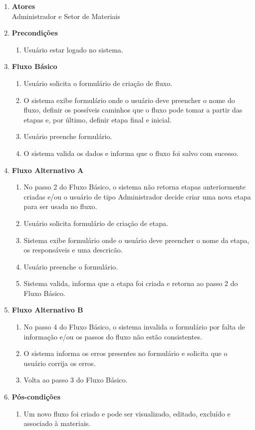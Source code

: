 \begin{enumerate}[label=\textbf{U02}, leftmargin=2cm]
	\begin{enumerate}[label=, leftmargin=0cm]
		\item \textbf{Atores} \\
		Administrador e Setor de Materiais
		\item \textbf{Precondições}
			\begin{enumerate}[label=\arabic*.]
				\item Usuário estar logado no sistema.
			\end{enumerate}
		\item \textbf{Fluxo Básico}
			\begin{enumerate}[label=\arabic*.]
				\item Usuário solicita o formulário de criação de fluxo.
				\item O sistema exibe formulário onde o usuário deve preencher o nome do fluxo, definir os possíveis caminhos que o fluxo pode tomar a partir das etapas e, por último, definir etapa final e inicial.
				\item Usuário preenche formulário.
				\item O sistema valida os dados e informa que o fluxo foi salvo com sucesso.
			\end{enumerate}
		\item \textbf{Fluxo Alternativo A}
			\begin{enumerate}[label=\arabic*.]
				\item No passo 2 do Fluxo Básico, o sistema não retorna etapas anteriormente criadas e/ou o usuário de tipo Administrador decide criar uma nova etapa para ser usada no fluxo. 
				\item Usuário solicita formulário de criação de etapa.
				\item Sistema exibe formulário onde o usuário deve preencher o nome da etapa, os responsáveis e uma descricão.
				\item Usuário preenche o formulário.
				\item Sistema valida, informa que a etapa foi criada e retorna ao passo 2 do Fluxo Básico.
			\end{enumerate}
		\item \textbf{Fluxo Alternativo B}
			\begin{enumerate}[label=\arabic*.]
				\item No passo 4 do Fluxo Básico, o sistema invalida o formulário por falta de informação e/ou os passos do fluxo não estão consistentes.
				\item O sistema informa os erros presentes no formulário e solicita que o usuário corrija os erros.
				\item Volta ao passo 3 do Fluxo Básico.
			\end{enumerate}
		\item \textbf{Pós-condições}
			\begin{enumerate}[label=\arabic*.]
				\item Um novo fluxo foi criado e pode ser visualizado, editado, excluído e associado à materiais.
			\end{enumerate}
	\end{enumerate}
	 
\end{enumerate}

